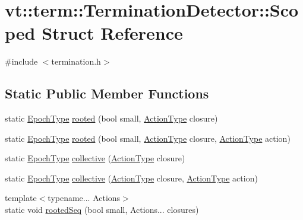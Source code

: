 \hypertarget{structvt_1_1term_1_1_termination_detector_1_1_scoped}{}\section{vt\+:\+:term\+:\+:Termination\+Detector\+:\+:Scoped Struct Reference}
\label{structvt_1_1term_1_1_termination_detector_1_1_scoped}


{\ttfamily \#include $<$termination.\+h$>$}

\subsection*{Static Public Member Functions}
\begin{DoxyCompactItemize}
\item 
static \hyperlink{namespacevt_a985a5adf291c34a3ca263b3378388236}{Epoch\+Type} \hyperlink{structvt_1_1term_1_1_termination_detector_1_1_scoped_a196ceebfdcc0b2782823a3239fd970bd}{rooted} (bool small, \hyperlink{namespacevt_ae0a5a7b18cc99d7b732cb4d44f46b0f3}{Action\+Type} closure)
\item 
static \hyperlink{namespacevt_a985a5adf291c34a3ca263b3378388236}{Epoch\+Type} \hyperlink{structvt_1_1term_1_1_termination_detector_1_1_scoped_a92cf8ce8367c98777475ab9d290d1572}{rooted} (bool small, \hyperlink{namespacevt_ae0a5a7b18cc99d7b732cb4d44f46b0f3}{Action\+Type} closure, \hyperlink{namespacevt_ae0a5a7b18cc99d7b732cb4d44f46b0f3}{Action\+Type} action)
\item 
static \hyperlink{namespacevt_a985a5adf291c34a3ca263b3378388236}{Epoch\+Type} \hyperlink{structvt_1_1term_1_1_termination_detector_1_1_scoped_a7debccd958f4257512a8640ab1ffb324}{collective} (\hyperlink{namespacevt_ae0a5a7b18cc99d7b732cb4d44f46b0f3}{Action\+Type} closure)
\item 
static \hyperlink{namespacevt_a985a5adf291c34a3ca263b3378388236}{Epoch\+Type} \hyperlink{structvt_1_1term_1_1_termination_detector_1_1_scoped_a199da03a9c1a2fbce14c15484e71bacc}{collective} (\hyperlink{namespacevt_ae0a5a7b18cc99d7b732cb4d44f46b0f3}{Action\+Type} closure, \hyperlink{namespacevt_ae0a5a7b18cc99d7b732cb4d44f46b0f3}{Action\+Type} action)
\item 
{\footnotesize template$<$typename... Actions$>$ }\\static void \hyperlink{structvt_1_1term_1_1_termination_detector_1_1_scoped_a80cfbd2ebb5cb7acec0be212bdf7eb76}{rooted\+Seq} (bool small, Actions... closures)
\end{DoxyCompactItemize}



